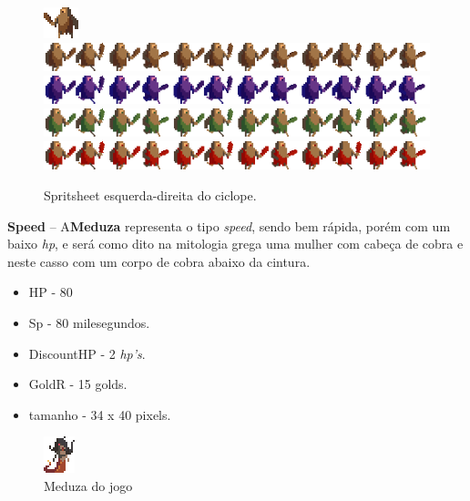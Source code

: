 \documentclass[11pt]{article} %
\begin{document}
\begin{figure}[!htp]
\centering
\advance\leftskip-3cm
\advance\rightskip-3cm
\includegraphics[scale=2]{res/units/ciclope/cyclop.png} \quad
\includegraphics[scale=1]{res/units/ciclope/ciclopsheet.png} \quad
\includegraphics[scale=1]{res/units/ciclope/ciclopsheet_congelado.png} \quad
\includegraphics[scale=1]{res/units/ciclope/ciclopsheet_verde.png} \quad
\includegraphics[scale=1]{res/units/ciclope/ciclopsheet_vermelho.png} 
\caption{Spritsheet esquerda-direita do ciclope.}
\label{ciclopesheet}
\end{figure}

\newpage
\textbf{{ {\large Speed}}} – A\textbf{Meduza} representa o tipo \textit{speed}, sendo bem rápida, porém com um baixo \textit{hp}, e será como dito na mitologia grega uma mulher com cabeça de cobra e neste casso com um corpo de cobra abaixo da cintura.

\begin{itemize}
\item HP - 80
\item Sp - 80 milesegundos.
\item DiscountHP - 2 \textit{hp's}.
\item GoldR - 15 golds.
\item tamanho - 34 x 40 pixels.
\end{itemize}

\begin{figure}[!htp]
\centering
\includegraphics[scale=4]{res/characters/medusa.png}
\caption{Meduza do jogo}
\label{Medusa}
\end{figure}
\end{document}
